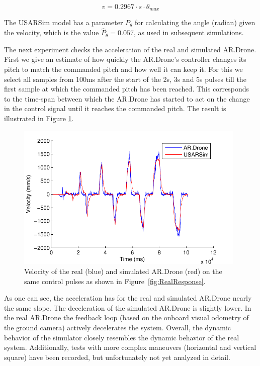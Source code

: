 \begin{equation}
v = 0.2967 \cdot s \cdot \theta_{max}
\label{eq:conversion}
\end{equation}

The USARSim model has a parameter $P_\theta$ for calculating the angle (radian) given the velocity, which
is the value $\hat{P}_\theta = 0.057$, as used in subsequent simulations.

The next experiment checks the acceleration of the real and simulated AR.Drone. First we give an estimate of how quickly the AR.Drone's controller changes its pitch to match the commanded pitch and how well it can keep it. For this we select all samples from 100ms after the start
of the 2s, 3s and 5s pulses till the first sample at which the commanded pitch has been reached. This
corresponds to the time-span between which the AR.Drone has started to act on the change in the control
signal until it reaches the commanded pitch. The result is illustrated in Figure \ref{fig:ComparisonOfResponse}.

\begin{figure}[htb]
\centering
\includegraphics[width=11cm]{images/RYtdB-eps-converted-to.pdf}
\caption{Velocity of the real (blue) and simulated AR.Drone (red) on the same control pulses as shown in Figure~\ref{fig:RealResponse}.}

\label{fig:ComparisonOfResponse}
\end{figure}

As one can see, the acceleration has for the real and simulated AR.Drone nearly the same slope. The deceleration of the simulated AR.Drone is slightly lower. In the real AR.Drone the feedback loop (based on the onboard visual odometry of the ground camera) actively decelerates the system. Overall, the dynamic behavior of the simulator closely resembles the dynamic behavior of the real system. Additionally, tests with more complex maneuvers (horizontal and vertical square) have been recorded, but unfortunately not yet analyzed in detail.




